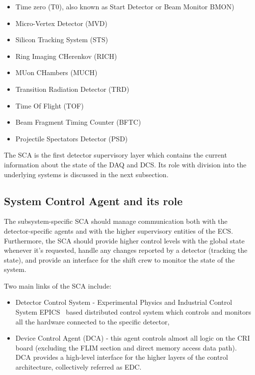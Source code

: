 \begin{itemize}
 \item Time zero (T0), also known as Start Detector or Beam Monitor \gls{BMON})
 \item Micro-Vertex Detector (\gls{MVD})
 \item Silicon Tracking System (\gls{STS})
 \item Ring Imaging CHerenkov (\gls{RICH})
 \item MUon CHambers (\gls{MUCH})
 \item Transition Radiation Detector (\gls{TRD})
 \item Time Of Flight (\gls{TOF})
 \item Beam Fragment Timing Counter (\gls{BFTC})
 \item Projectile Spectators Detector (\gls{PSD})
\end{itemize}

The SCA is the first detector supervisory layer which contains the current information about the state of the \gls{DAQ} and \gls{DCS}. Its role with division into the underlying systems is discussed in the next subsection.

\subsection{System Control Agent and its role}
The subsystem-specific \gls{SCA} should manage communication both with the detector-specific agents and with the higher supervisory entities of the \gls{ECS}. Furthermore, the \gls{SCA} should provide higher control levels with the global state whenever it's requested, handle any changes reported by a detector (tracking the state), and provide an interface for the shift crew to monitor the state of the system. 

Two main links of the \gls{SCA} include:
\begin{itemize}
    \item Detector Control System - Experimental Physics and Industrial Control System \gls{EPICS}~\cite{EPICS} based distributed control system which controls and monitors all the hardware connected to the specific detector,
    \item Device Control Agent (\gls{DCA}) - this agent controls almost all logic on the \gls{CRI} board (excluding the \gls{FLIM} section and direct memory access data path). \gls{DCA} provides a high-level interface for the higher layers of the control architecture, collectively referred as \gls{EDC}. 
\end{itemize}










